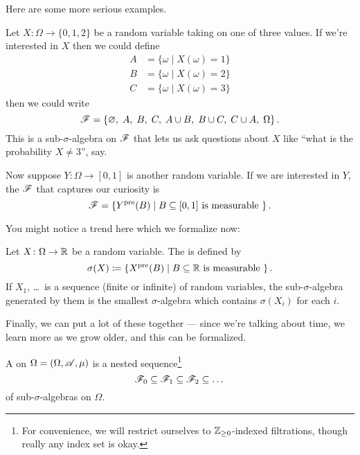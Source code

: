 Here are some more serious examples.
\begin{example}
	\listhack
	\begin{enumerate}[(a)]
		\ii Let $X \colon \Omega \to \{0,1,2\}$ be a random
		variable taking on one of three values.
		If we're interested in $X$ then we could define
		\begin{align*}
			A &= \{\omega \mid X(\omega) = 1\} \\
			B &= \{\omega \mid X(\omega) = 2\} \\
			C &= \{\omega \mid X(\omega) = 3\}
		\end{align*}
		then we could write
		\[ \mathscr F = \left\{ \varnothing, \; A, \; B, \; C, \;
				A \cup B, \; B \cup C, \; C \cup A, \; \Omega \right\}. \]
		This is a sub-$\sigma$-algebra on $\mathscr F$
		that lets us ask questions about $X$
		like ``what is the probability $X \neq 3$'', say.

		\ii Now suppose $Y \colon \Omega \to [0,1]$ is another random variable.
		If we are interested in $Y$,
		the $\mathscr F$ that captures our curiosity is
		\[ \mathscr F = \left\{ Y^{\text{pre}}(B) \mid B \subseteq [0,1]
			\text{ is measurable } \right\}. \]
	\end{enumerate}
\end{example}

You might notice a trend here which we formalize now:
\begin{definition}
	Let $X \colon \Omega \to \mathbb R$ be a random variable.
	The  is defined by
	\[ \sigma(X) \coloneqq \left\{ X^{\text{pre}}(B) \mid B \subseteq \mathbb R
		\text{ is measurable } \right\}. \]
	If $X_1$, \dots\ is a sequence (finite or infinite) of random variables,
	the sub-$\sigma$-algebra generated by them
	is the smallest $\sigma$-algebra which contains $\sigma(X_i)$ for each $i$.
\end{definition}

Finally, we can put a lot of these together ---
since we're talking about time, we learn more as we grow older,
and this can be formalized.
\begin{definition}
	A  on $\Omega = (\Omega, \mathscr A, \mu)$
	is a nested sequence\footnote{For convenience,
		we will restrict ourselves to $\mathbb Z_{\ge0}$-indexed
		filtrations, though really any index set is okay.}
	\[ \mathscr F_0 \subseteq \mathscr F_1 \subseteq \mathscr F_2 \subseteq \dots \]
	of sub-$\sigma$-algebras on $\Omega$.
\end{definition}

